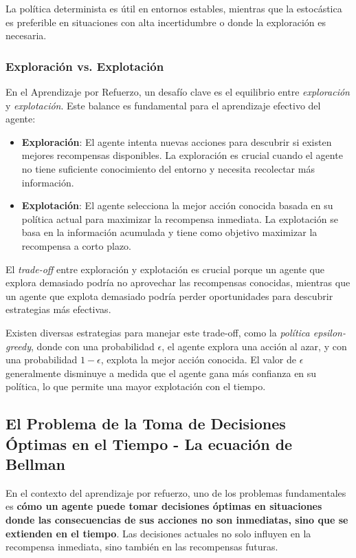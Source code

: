 \documentclass[a4paper,12pt]{report}
\begin{document}
La política determinista es útil en entornos estables, mientras que la estocástica es preferible en situaciones con alta incertidumbre o donde la exploración es necesaria.


\subsubsection{Exploración vs. Explotación}

En el Aprendizaje por Refuerzo, un desafío clave es el equilibrio entre \textit{exploración} y 
\textit{explotación}. Este balance es fundamental para el aprendizaje efectivo del agente:

\begin{itemize}
    \item \textbf{Exploración}: El agente intenta nuevas acciones para descubrir si existen mejores 
    recompensas disponibles. La exploración es crucial cuando el agente no tiene suficiente conocimiento 
    del entorno y necesita recolectar más información.
    \item \textbf{Explotación}: El agente selecciona la mejor acción conocida basada en su 
    política actual para maximizar la recompensa inmediata. La explotación se basa en la información 
    acumulada y tiene como objetivo maximizar la recompensa a corto plazo.
\end{itemize}

El \textit{trade-off} entre exploración y explotación es crucial porque un agente que explora 
demasiado podría no aprovechar las recompensas conocidas, mientras que un agente que explota 
demasiado podría perder oportunidades para descubrir estrategias más efectivas. 

Existen diversas estrategias para manejar este trade-off, como la \textit{política epsilon-greedy}, 
donde con una probabilidad \(\epsilon\), el agente explora una acción al azar, y con 
una probabilidad \(1-\epsilon\), explota la mejor acción conocida. El valor de \(\epsilon\) 
generalmente disminuye a medida que el agente gana más confianza en su política, lo que permite 
una mayor explotación con el tiempo.


\subsection{El Problema de la Toma de Decisiones Óptimas en el Tiempo - La ecuación de Bellman}


En el contexto del aprendizaje por refuerzo, uno de los problemas fundamentales es 
\textbf{cómo un agente puede tomar decisiones óptimas en situaciones donde las consecuencias de 
sus acciones no son inmediatas, sino que se extienden en el tiempo}. Las decisiones actuales no 
solo influyen en la recompensa inmediata, sino también en las recompensas futuras. 
\end{document}
